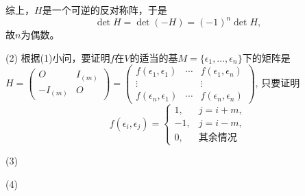 综上，$H$是一个可逆的反对称阵，于是
$$\det H = \det (-H) = (-1)^n \det H,$$
故$n$为偶数。

(2) 根据(1)小问，要证明$f$在$V$的适当的基$M = \{ \epsilon_1, \ldots, \epsilon_n \}$下的矩阵是$H = \begin{pmatrix} O & I_{(m)} \\ -I_{(m)} & O \end{pmatrix} = \begin{pmatrix} f(\epsilon_1, \epsilon_1) & \cdots & f(\epsilon_1, \epsilon_n) \\ \vdots & & \vdots \\ f(\epsilon_n, \epsilon_1) & \cdots & f(\epsilon_n, \epsilon_n) \end{pmatrix}$, 只要证明
\begin{equation*}
f(\epsilon_i, \epsilon_j) = \begin{cases}
1, & j = i + m, \\
-1, & j = i - m, \\
0, & \text{其余情况}
\end{cases}
\end{equation*}

(3) 

(4) 


